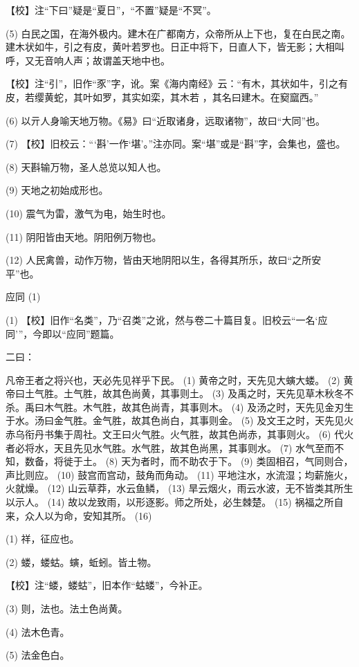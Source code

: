 \documentclass[12pt,UTF8]{ctexbook}
\begin{document}
【校】注“下曰”疑是“夏日”，“不置”疑是“不冥”。

(5) 白民之国，在海外极内。建木在广都南方，众帝所从上下也，复在白民之南。建木状如牛，引之有皮，黄叶若罗也。日正中将下，日直人下，皆无影；大相叫呼，又无音响人声；故谓盖天地中也。

【校】注“引”，旧作“豕”字，讹。案《海内南经》云：“有木，其状如牛，引之有皮，若缨黄蛇，其叶如罗，其实如栾，其木若 ，其名曰建木。在窫窳西。”

(6) 以亓人身喻天地万物。《易》曰“近取诸身，远取诸物”，故曰“大同”也。

(7) 【校】旧校云：“‘斟’一作‘堪’。”注亦同。案“堪”或是“斟”字，会集也，盛也。

(8) 天斟输万物，圣人总览以知人也。

(9) 天地之初始成形也。

(10) 震气为雷，激气为电，始生时也。

(11) 阴阳皆由天地。阴阳例万物也。

(12) 人民禽兽，动作万物，皆由天地阴阳以生，各得其所乐，故曰“之所安平”也。





应同 (1)


(1) 【校】旧作“名类”，乃“召类”之讹，然与卷二十篇目复。旧校云“一名‘应同’”，今即以“应同”题篇。

二曰：

凡帝王者之将兴也，天必先见祥乎下民。 (1) 黄帝之时，天先见大螾大蝼。 (2) 黄帝曰土气胜。土气胜，故其色尚黄，其事则土。 (3) 及禹之时，天先见草木秋冬不杀。禹曰木气胜。木气胜，故其色尚青，其事则木。 (4) 及汤之时，天先见金刃生于水。汤曰金气胜。金气胜，故其色尚白，其事则金。 (5) 及文王之时，天先见火赤乌衔丹书集于周社。文王曰火气胜。火气胜，故其色尚赤，其事则火。 (6) 代火者必将水，天且先见水气胜。水气胜，故其色尚黑，其事则水。 (7) 水气至而不知，数备，将徙于土。 (8) 天为者时，而不助农于下。 (9) 类固相召，气同则合，声比则应。 (10) 鼓宫而宫动，鼓角而角动。 (11) 平地注水，水流湿；均薪施火，火就燥。 (12) 山云草莽，水云鱼鳞， (13) 旱云烟火，雨云水波，无不皆类其所生以示人。 (14) 故以龙致雨，以形逐影。师之所处，必生棘楚。 (15) 祸福之所自来，众人以为命，安知其所。 (16)

(1) 祥，征应也。

(2) 蝼，蝼蛄。螾，蚯蚓。皆土物。

【校】注“蝼，蝼蛄”，旧本作“蛄蝼”，今补正。

(3) 则，法也。法土色尚黄。

(4) 法木色青。

(5) 法金色白。
\end{document}
